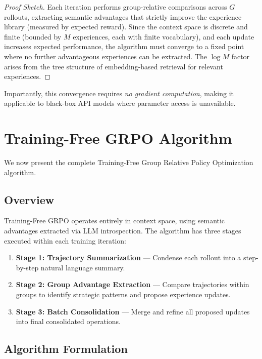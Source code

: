 \documentclass[11pt,a4paper]{article}
\begin{document}
\begin{proof}[Proof Sketch]
Each iteration performs group-relative comparisons across $G$ rollouts, extracting semantic advantages that strictly improve the experience library (measured by expected reward). Since the context space is discrete and finite (bounded by $M$ experiences, each with finite vocabulary), and each update increases expected performance, the algorithm must converge to a fixed point where no further advantageous experiences can be extracted. The $\log M$ factor arises from the tree structure of embedding-based retrieval for relevant experiences.
\end{proof}

Importantly, this convergence requires \textit{no gradient computation}, making it applicable to black-box API models where parameter access is unavailable.

\section{Training-Free GRPO Algorithm}
\label{sec:algorithm}

We now present the complete Training-Free Group Relative Policy Optimization algorithm.

\subsection{Overview}

Training-Free GRPO operates entirely in context space, using semantic advantages extracted via LLM introspection. The algorithm has three stages executed within each training iteration:

\begin{enumerate}
    \item \textbf{Stage 1: Trajectory Summarization} — Condense each rollout into a step-by-step natural language summary.
    \item \textbf{Stage 2: Group Advantage Extraction} — Compare trajectories within groups to identify strategic patterns and propose experience updates.
    \item \textbf{Stage 3: Batch Consolidation} — Merge and refine all proposed updates into final consolidated operations.
\end{enumerate}

\subsection{Algorithm Formulation}
\end{document}

